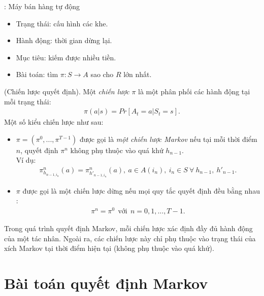 \begin{vd} \rm: Máy bán hàng tự động
\begin{itemize}
\item Trạng thái: cấu hình các khe.
\item Hành động: thời gian dừng lại.
\item Mục tiêu: kiếm được nhiều tiền.
\item Bài toán: tìm $\pi:S\to A$ sao cho $R$ lớn nhất.
\end{itemize}
\end{vd}
\begin{dn}\rm
(Chiến lược quyết định). Một\textit{ chiến lược }$\pi$ là một phân phối các hành động tại mỗi trạng thái:
\begin{align*}
\pi (a|s)=Pr[A_t=a|S_t=s].
\end{align*}
Một số kiểu chiến lược như sau:
\begin{itemize}
\item $\pi=(\pi^0,...,\pi^{T-1})$ được gọi là \textit{một chiến lược Markov} nếu tại mỗi thời điểm $n$, quyết định $\pi^n$ không phụ thuộc vào quá khứ $h_{n-1}$.\\
 Ví dụ: \begin{align*}
 \pi_{h_{n-1,i_n}}^{n}(a)=\pi_{h'_{n-1,i_n}}^{n}(a),~ a \in A(i_n), ~i_n \in S ~\forall ~h_{n-1},~h'_{n-1}.
 \end{align*}
 \item $\pi$ được gọi là một chiến lược dừng nếu mọi quy tắc quyết định đều bằng nhau :
 \begin{align*}
 \pi^n=\pi^0~~\text{với}~~n=0,1,...,T-1.
 \end{align*}
\end{itemize}
Trong quá trình quyết định Markov, mỗi chiến lược xác định đầy đủ hành động của một tác nhân. Ngoài ra, các chiến lược này chỉ phụ thuộc vào trạng thái của xích Markov tại thời điểm hiện tại (không phụ thuộc vào quá khứ).
\end{dn}
\section{Bài toán quyết định Markov}
